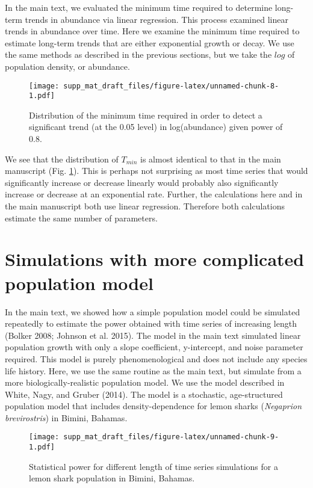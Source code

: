 \documentclass[12pt,]{article}
\begin{document}
In the main text, we evaluated the minimum time required to determine
long-term trends in abundance via linear regression. This process
examined linear trends in abundance over time. Here we examine the
minimum time required to estimate long-term trends that are either
exponential growth or decay. We use the same methods as described in the
previous sections, but we take the \(log\) of population density, or
abundance.

\begin{figure}[htbp]
\centering
\texttt{[image: supp\_mat\_draft\_files/figure-latex/unnamed-chunk-8-1.pdf]}
\caption{Distribution of the minimum time required in order to detect a
significant trend (at the 0.05 level) in log(abundance) given power of
0.8.\label{fig:min_time_dist_log_pop}}
\end{figure}

We see that the distribution of \(T_{min}\) is almost identical to that
in the main manuscript (Fig. \ref{fig:min_time_dist_log_pop}). This is
perhaps not surprising as most time series that would significantly
increase or decrease linearly would probably also significantly increase
or decrease at an exponential rate. Further, the calculations here and
in the main manuscript both use linear regression. Therefore both
calculations estimate the same number of parameters.

\pagebreak

\section{Simulations with more complicated population
model}\label{simulations-with-more-complicated-population-model}

In the main text, we showed how a simple population model could be
simulated repeatedly to estimate the power obtained with time series of
increasing length (Bolker 2008; Johnson et al. 2015). The model in the
main text simulated linear population growth with only a slope
coefficient, y-intercept, and noise parameter required. This model is
purely phenomenological and does not include any species life history.
Here, we use the same routine as the main text, but simulate from a more
biologically-realistic population model. We use the model described in
White, Nagy, and Gruber (2014). The model is a stochastic,
age-structured population model that includes density-dependence for
lemon sharks (\emph{Negaprion brevirostris}) in Bimini, Bahamas.

\begin{figure}[htbp]
\centering
\texttt{[image: supp\_mat\_draft\_files/figure-latex/unnamed-chunk-9-1.pdf]}
\caption{Statistical power for different length of time series
simulations for a lemon shark population in Bimini,
Bahamas.\label{fig:shark_example}}
\end{figure}
\end{document}
